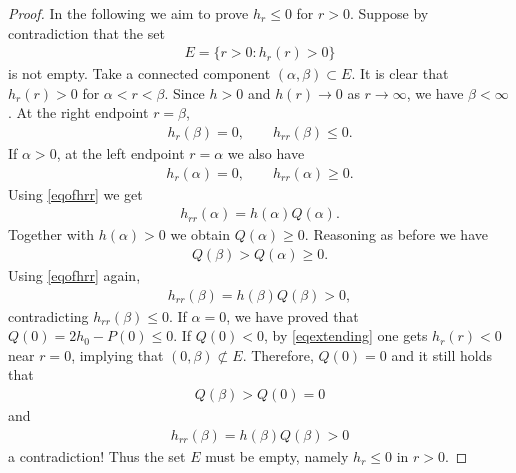 \documentclass[10pt,a4paper]{amsart}
\begin{document}
\begin{proof}
		In the following we aim to prove $h_r \le 0$ for $r > 0$. Suppose by contradiction that the set
		\begin{align*}
			E = \big\{r > 0: h_r(r) > 0\big\}
		\end{align*}
		is not empty. Take a connected component $(\alpha,\beta) \subset E$. It is clear that $h_r(r) > 0$ for $\alpha < r < \beta$. Since $h > 0$ and $h(r) \to 0$ as $r \to \infty$, we have $\beta < \infty$. At the right endpoint $r = \beta$,
		\begin{align*}
			h_r(\beta) = 0, \quad\quad h_{rr}(\beta) \le 0.
		\end{align*}
		If $\alpha > 0$, at the left endpoint $r = \alpha$ we also have
		\begin{align*}
			h_r(\alpha) = 0, \quad\quad h_{rr}(\alpha) \ge 0.
		\end{align*}
		Using \eqref{eqofhrr} we get
		\begin{align*}
			h_{rr}(\alpha) = h(\alpha)Q(\alpha).
		\end{align*}
		Together with $h(\alpha) > 0$ we obtain $Q(\alpha) \ge 0$. Reasoning as before we have
		\begin{align*}
			Q(\beta) > Q(\alpha) \ge 0.
		\end{align*}
		Using \eqref{eqofhrr} again,
		\begin{align*}
			h_{rr}(\beta) = h(\beta)Q(\beta) > 0,
		\end{align*}
		contradicting $h_{rr}(\beta) \le 0$. If $\alpha = 0$, we have proved that $Q(0) = 2h_0 - P(0) \le 0$. If $Q(0) < 0$, by \eqref{eqextending} one gets $h_r(r) < 0$ near $r = 0$, implying that $(0,\beta) \not\subset E$. Therefore, $Q(0) = 0$ and it still holds that
		\begin{align*}
			Q(\beta) > Q(0) = 0
		\end{align*}
		and
		\begin{align*}
			h_{rr}(\beta) = h(\beta)Q(\beta) > 0
		\end{align*}
		a contradiction! Thus the set $E$ must be empty, namely $h_r \le 0$ in $r > 0$.


\end{proof}
\end{document}
